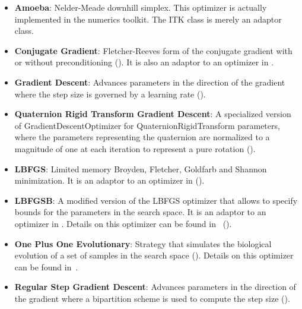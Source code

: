 \begin{itemize}

\item \textbf{Amoeba}: Nelder-Meade downhill simplex.  This optimizer is
actually implemented in the  numerics toolkit.  The ITK class
 is merely an adaptor class.

\item \textbf{Conjugate Gradient}: Fletcher-Reeves form
of the conjugate gradient with or without preconditioning
(). It is also an adaptor to an optimizer in
.

\item \textbf{Gradient Descent}: Advances parameters in the direction of the
gradient where the step size is governed by a learning rate
().

\item \textbf{Quaternion Rigid Transform Gradient Descent}: A specialized
version of GradientDescentOptimizer for QuaternionRigidTransform parameters,
where the parameters representing the quaternion are normalized to a magnitude
of one at each iteration to represent a pure rotation
().

\item \textbf{LBFGS}: Limited memory Broyden, Fletcher, Goldfarb
and Shannon minimization. It is an adaptor to an optimizer in 
().

\item \textbf{LBFGSB}: A modified version of the LBFGS optimizer that allows to
specify bounds for the parameters in the search space.  It is an adaptor to an
optimizer in . Details on this optimizer can be found
in~\cite{Byrd1995,Zhu1997} ().

\item \textbf{One Plus One Evolutionary}: Strategy that simulates the
biological evolution of a set of samples in the search space (). Details on this optimizer can be
found in~\cite{Styner2000}.

\item \textbf{Regular Step Gradient Descent}: Advances parameters in the
direction of the gradient where a bipartition scheme is used to compute
the step size ().


\end{itemize}
